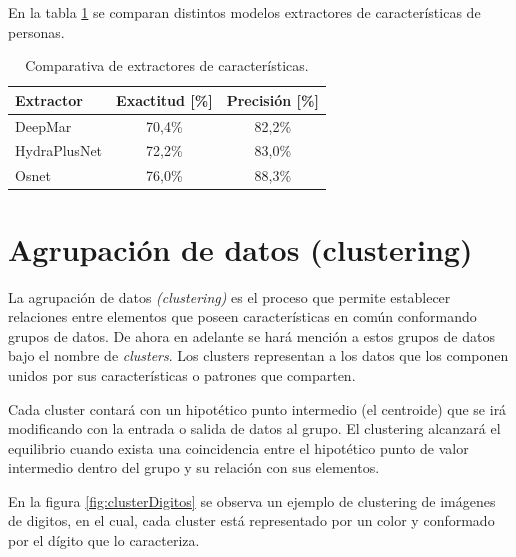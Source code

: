 
En la tabla \ref{tab:comparativaExtractores} se comparan distintos modelos extractores de características de personas.

\begin{table}[h]
	\centering
	\caption[Comparativa de extractores de características]{Comparativa de extractores de características.}
	\begin{tabular}{l c c}    
		\toprule
		\textbf{Extractor} & \textbf{Exactitud [\%]}  & \textbf{Precisión [\%]} \\
		\midrule
		DeepMar & 70,4\% & 82,2\% \\
		HydraPlusNet & 72,2\% & 83,0\% \\
		Osnet & 76,0\% & 88,3\% \\
		\bottomrule
		\hline
	\end{tabular}
	\label{tab:comparativaExtractores}
\end{table}

\newpage


\section{Agrupación de datos (clustering)}
\label{sec:clustering}

La agrupación de datos \textit{(clustering)} es el proceso que permite establecer relaciones entre elementos que poseen características en común conformando grupos de datos. De ahora en adelante se hará mención a estos grupos de datos bajo el nombre de \textit{clusters}. Los clusters representan a los datos que los componen  unidos por sus características o patrones que comparten.

Cada cluster contará con un hipotético punto intermedio (el centroide) que se irá modificando con la entrada o salida de datos al grupo. El clustering alcanzará el equilibrio cuando exista una coincidencia entre el hipotético punto de valor intermedio dentro del grupo y su relación con sus elementos. 

En la figura \ref{fig:clusterDigitos} se observa un ejemplo de clustering de imágenes de digitos, en el cual, cada cluster está representado por un color y conformado por el dígito que lo caracteriza.

